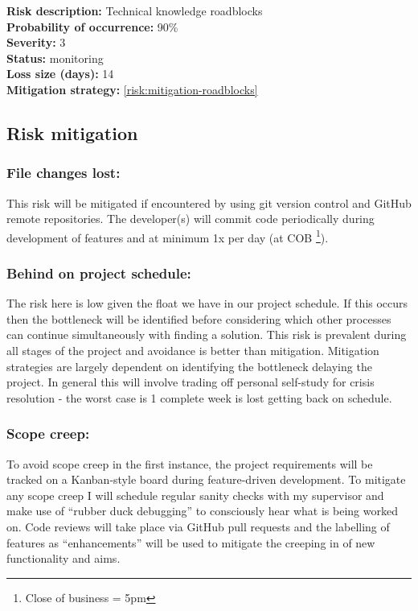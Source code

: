 \hrulefill

\textbf{Risk description:} Technical knowledge roadblocks\\
\vspace{-2mm}
\textbf{Probability of occurrence:} 90\%\\
\vspace{-2mm}
\textbf{Severity:} 3\\
\vspace{-2mm}
\textbf{Status:} monitoring\\
\vspace{-2mm}
\textbf{Loss size (days):} 14\\
\textbf{Mitigation strategy:} \cref{risk:mitigation-roadblocks}\\
\par

\subsection{Risk mitigation}
\subsubsection{File changes lost:}
\label{risk:mitigation-files}
\vspace{-2mm}
This risk will be mitigated if encountered by using git version control and GitHub remote repositories.
The developer(s) will commit code periodically during development of features
and at minimum 1x per day (at COB \footnote{Close of business = 5pm}).

\subsubsection{Behind on project schedule:}
\label{risk:mitigation-timeline}
\vspace{-2mm}
The risk here is low given the float we have in our project schedule.
If this occurs then the bottleneck will be identified before considering
which other processes can continue simultaneously with finding a solution. This risk 
is prevalent during all stages of the project and avoidance is better than mitigation.
Mitigation strategies are largely dependent on identifying the bottleneck delaying the project.
In general this will involve trading off personal self-study for crisis resolution - the worst case is 1 complete week is lost
getting back on schedule.

\subsubsection{Scope creep:}
\label{risk:mitigation-scope}
\vspace{-2mm}
To avoid scope creep in the first instance, the project requirements will be tracked on a Kanban-style board during
feature-driven development. To mitigate any scope creep I will schedule regular sanity checks with my supervisor and
make use of ``rubber duck debugging'' to consciously hear what is being worked on.
Code reviews will take place via GitHub pull requests and the labelling of features
as ``enhancements'' will be used to mitigate the creeping in of new functionality and aims.

